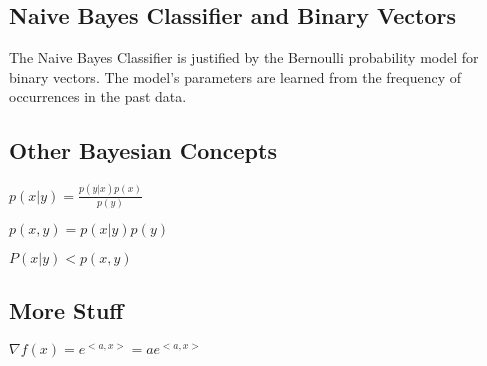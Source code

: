 \documentclass[10pt]{article}
\begin{document}
\begin{multicols}{2}
\subsection*{Naive Bayes Classifier and Binary Vectors}
The Naive Bayes Classifier is justified by the Bernoulli probability model for binary vectors. The model's parameters are learned from the frequency of occurrences in the past data.
\subsection*{Other Bayesian Concepts}
$p(x|y) = \frac{p(y|x)p(x)}{p(y)}$

$p(x,y) = p(x|y)p(y)$

$P(x|y) < p(x,y)$
\subsection*{More Stuff}
$\nabla f(x) = e^{<a, x>} = a e^{<a, x>}$
\end{multicols}
\end{document}
